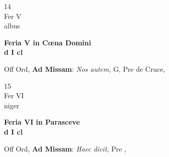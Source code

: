 \documentclass[10pt, openany]{book}
\begin{document}
        \begin{center}
            \begin{minipage}{3.5in}
                \vspace{2em}
                \begin{minipage}{0.5in}
                    {\Huge 14} \\
                    {\normalsize Fer V} \\
                    {\normalsize albus}
                \end{minipage}
                \begin{minipage}{3.0in}
                    \textbf{ \large Feria V in Cœna Domini \\
                    \textnormal{\normalsize d I cl}} \\ 
                \end{minipage}
                \begin{justify}Off Ord, \textbf{Ad Missam}: \textit{Nos autem,} G, Pre de Cruce,   
                \end{justify}
            \end{minipage}
        \end{center}
    
        \begin{center}
            \begin{minipage}{3.5in}
                \vspace{2em}
                \begin{minipage}{0.5in}
                    {\Huge 15} \\
                    {\normalsize Fer VI} \\
                    {\normalsize niger}
                \end{minipage}
                \begin{minipage}{3.0in}
                    \textbf{ \large Feria VI in Parasceve \\
                    \textnormal{\normalsize d I cl}} \\ 
                \end{minipage}
                \begin{justify}Off Ord, \textbf{Ad Missam}: \textit{Haec dicit,} Pre ,   
                \end{justify}
            \end{minipage}
        \end{center}
    
\end{document}
